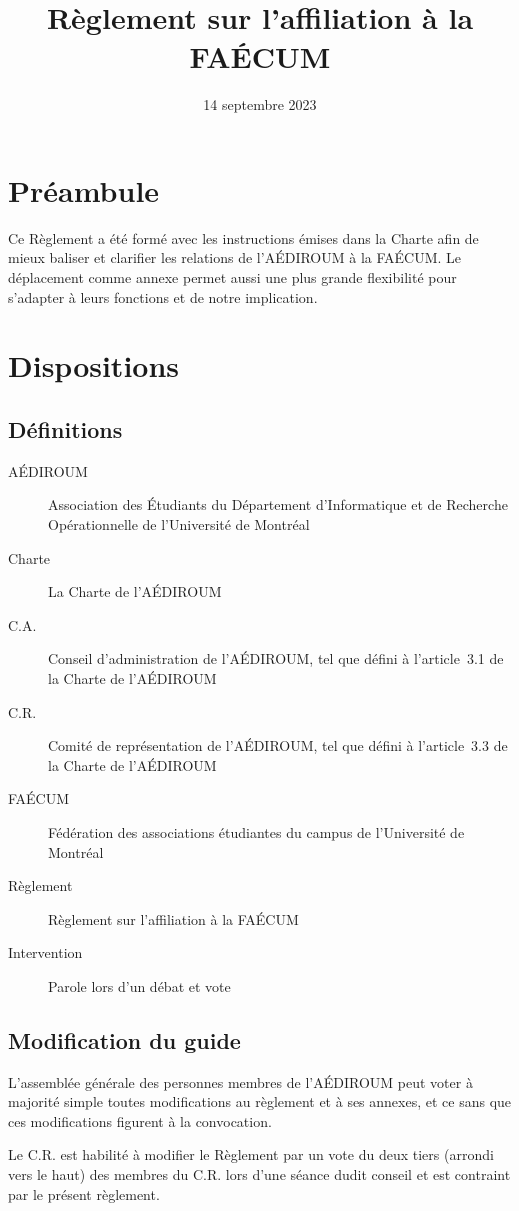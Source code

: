 \documentclass{aediroum}
\title{Règlement sur l'affiliation à la FAÉCUM}
\date{14 septembre 2023}
\begin{document}
\maketitle

\section{Préambule}
Ce Règlement a été formé avec les instructions émises dans la Charte afin de mieux baliser et clarifier les relations de l'AÉDIROUM à la FAÉCUM. Le déplacement comme annexe permet aussi une plus grande flexibilité pour s'adapter à leurs fonctions et de notre implication.

\section{Dispositions}

\subsection{Définitions}
\begin{description}
	\item[AÉDIROUM] Association des Étudiants du Département d'Informatique et de Recherche Opérationnelle de l'Université de Montréal
	\item[Charte] La Charte de l'AÉDIROUM
	\item[C.A.] Conseil d'administration de l'AÉDIROUM, tel que défini à l'article~3.1 de la Charte de l'AÉDIROUM
	\item[C.R.] Comité de représentation de l'AÉDIROUM, tel que défini à l'article~3.3 de la Charte de l'AÉDIROUM
	\item[FAÉCUM] Fédération des associations étudiantes du campus de l'Université de Montréal
	\item[Règlement] Règlement sur l'affiliation à la FAÉCUM
	\item[Intervention] Parole lors d'un débat et vote
\end{description}

\subsection{Modification du guide}
L'assemblée générale des personnes membres de l'AÉDIROUM peut voter à majorité simple toutes modifications au règlement et à ses annexes, et ce sans que ces modifications figurent à la convocation.

Le C.R. est habilité à modifier le Règlement par un vote du deux tiers (arrondi vers le haut) des membres du C.R. lors d'une séance dudit conseil et est contraint par le présent règlement.
\end{document}
